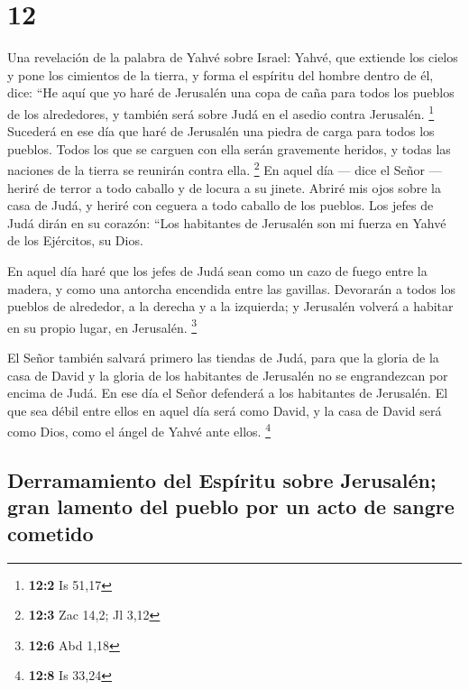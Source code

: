 \hypertarget{section-11}{%
\section{12}\label{section-11}}

 Una revelación de la palabra de Yahvé sobre Israel:
Yahvé, que extiende los cielos y pone los cimientos de la tierra, y
forma el espíritu del hombre dentro de él, dice:  ``He
aquí que yo haré de Jerusalén una copa de caña para todos los pueblos de
los alrededores, y también será sobre Judá en el asedio contra
Jerusalén. \footnote{\textbf{12:2} Is 51,17}  Sucederá en
ese día que haré de Jerusalén una piedra de carga para todos los
pueblos. Todos los que se carguen con ella serán gravemente heridos, y
todas las naciones de la tierra se reunirán contra ella. \footnote{\textbf{12:3}
  Zac 14,2; Jl 3,12}  En aquel día --- dice el Señor ---
heriré de terror a todo caballo y de locura a su jinete. Abriré mis ojos
sobre la casa de Judá, y heriré con ceguera a todo caballo de los
pueblos.  Los jefes de Judá dirán en su corazón: ``Los
habitantes de Jerusalén son mi fuerza en Yahvé de los Ejércitos, su
Dios.

 En aquel día haré que los jefes de Judá sean como un cazo
de fuego entre la madera, y como una antorcha encendida entre las
gavillas. Devorarán a todos los pueblos de alrededor, a la derecha y a
la izquierda; y Jerusalén volverá a habitar en su propio lugar, en
Jerusalén. \footnote{\textbf{12:6} Abd 1,18}

 El Señor también salvará primero las tiendas de Judá,
para que la gloria de la casa de David y la gloria de los habitantes de
Jerusalén no se engrandezcan por encima de Judá.  En ese
día el Señor defenderá a los habitantes de Jerusalén. El que sea débil
entre ellos en aquel día será como David, y la casa de David será como
Dios, como el ángel de Yahvé ante ellos. \footnote{\textbf{12:8} Is
  33,24}

\hypertarget{derramamiento-del-espuxedritu-sobre-jerusaluxe9n-gran-lamento-del-pueblo-por-un-acto-de-sangre-cometido}{%
\subsection{Derramamiento del Espíritu sobre Jerusalén; gran lamento del
pueblo por un acto de sangre
cometido}\label{derramamiento-del-espuxedritu-sobre-jerusaluxe9n-gran-lamento-del-pueblo-por-un-acto-de-sangre-cometido}}

